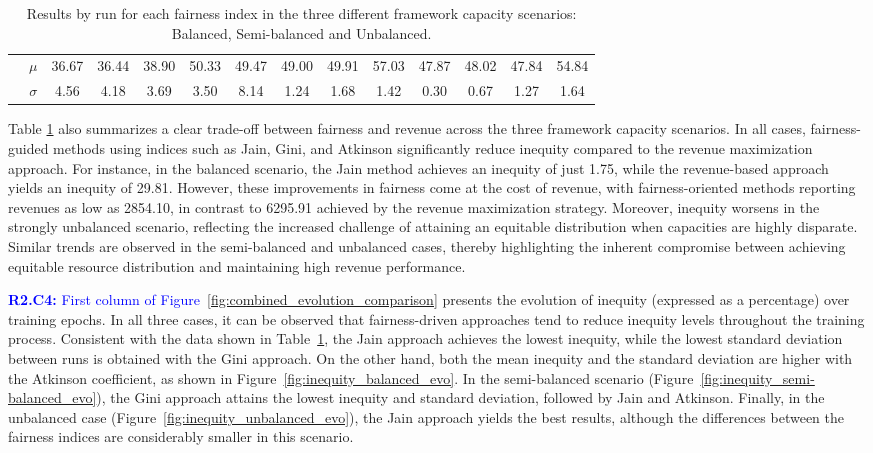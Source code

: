 \documentclass[preprint,12pt]{elsarticle}
\begin{document}
\begin{table}[htbp]
\begin{adjustbox}{max width=\textwidth}
\begin{tabular}{|c|c|cccc|cccc|cccc|}
   & $\mu$    & 36.67   & 36.44   & 38.90   & 50.33   & 49.47   & 49.00   & 49.91   & 57.03   & 47.87   & 48.02   & 47.84   & 54.84 \\
\cline{2-14}
   & $\sigma$ & 4.56    & 4.18    & 3.69    & 3.50    & 8.14    & 1.24    & 1.68    & 1.42    & 0.30    & 0.67    & 1.27    & 1.64 \\
\hline
\end{tabular}
\end{adjustbox}
\caption{Results by run for each fairness index in the three different framework capacity scenarios: Balanced, Semi-balanced and Unbalanced.}
\label{tab:comparison_summarized}
\end{table}

Table \ref{tab:comparison_summarized} also summarizes a clear trade-off between fairness and revenue across the three framework capacity scenarios. In all cases, fairness-guided methods using indices such as Jain, Gini, and Atkinson significantly reduce inequity compared to the revenue maximization approach. For instance, in the balanced scenario, the Jain method achieves an inequity of just 1.75, while the revenue-based approach yields an inequity of 29.81. However, these improvements in fairness come at the cost of revenue, with fairness-oriented methods reporting revenues as low as 2854.10, in contrast to 6295.91 achieved by the revenue maximization strategy. Moreover, inequity worsens in the strongly unbalanced scenario, reflecting the increased challenge of attaining an equitable distribution when capacities are highly disparate. Similar trends are observed in the semi-balanced and unbalanced cases, thereby highlighting the inherent compromise between achieving equitable resource distribution and maintaining high revenue performance.

\textcolor{blue}{\textbf{R2.C4:} First column of Figure~\ref{fig:combined_evolution_comparison}} presents the evolution of inequity (expressed as a percentage) over training epochs. In all three cases, it can be observed that fairness-driven approaches tend to reduce inequity levels throughout the training process. Consistent with the data shown in Table~\ref{tab:comparison_summarized}, the Jain approach achieves the lowest inequity, while the lowest standard deviation between runs is obtained with the Gini approach. On the other hand, both the mean inequity and the standard deviation are higher with the Atkinson coefficient, as shown in Figure~\ref{fig:inequity_balanced_evo}. In the semi-balanced scenario (Figure~\ref{fig:inequity_semi-balanced_evo}), the Gini approach attains the lowest inequity and standard deviation, followed by Jain and Atkinson. Finally, in the unbalanced case (Figure~\ref{fig:inequity_unbalanced_evo}), the Jain approach yields the best results, although the differences between the fairness indices are considerably smaller in this scenario.
\end{document}
